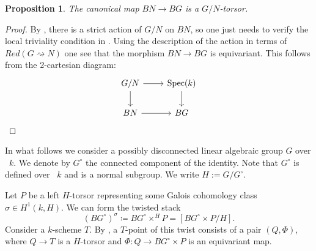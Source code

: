 \documentclass[12pt, final]{amsart}
\theoremstyle{remark}
\theoremstyle{definition}
\theoremstyle{plain}
\newtheorem{proposition}[example]{Proposition}
\newcommand{\rsa}{\rightsquigarrow}
\begin{document}
\begin{proposition}\label{p:basicExample}
    The canonical map $BN\to BG$ is a $G/N$-torsor.
\end{proposition}

\begin{proof}By , there is a strict action of $G/N$ on $BN$, so one just needs to 
    verify the local triviality condition in . Using the description of the action in terms of 
    $Red(G\rsa N)$ one see that the morphism $BN\to BG$ is equivariant. This follows from 
    the 2-cartesian diagram:
    $$
    \begin{tikzcd}
        {G/N} & {\text{Spec}(k)} \\
        BN & BG
        \arrow[from=1-1, to=1-2]
        \arrow[from=1-1, to=2-1]
        \arrow[from=1-2, to=2-2]
        \arrow[from=2-1, to=2-2]
    \end{tikzcd}
    $$
\end{proof}


In what follows we consider a possibly disconnected linear algebraic group $G$ over ~$k$. We denote by $G^{\circ}$ the connected component of the 
identity. Note that $G^{\circ}$ is defined over ~$k$ and is a normal subgroup. We write $H:= G/G^{\circ}$. 

Let $P$ be a left $H$-torsor representing some Galois cohomology class  $\sigma\in H^1(k,H)$. We can form the twisted stack 
$$(BG^{\circ})^{\sigma} \coloneqq BG^{\circ}\times^{H}P = [BG^{\circ}\times P/H]. 
$$
Consider a $k$-scheme $T$. 
By \cite[Theorem 4.1]{romagny:05}, a $T$-point of this twist consists of a pair $(Q,\Phi)$,
where $Q\to T$ is a $H$-torsor and $\Phi:Q\to BG^{\circ}\times P$ is an equivariant map. 


\end{document}
